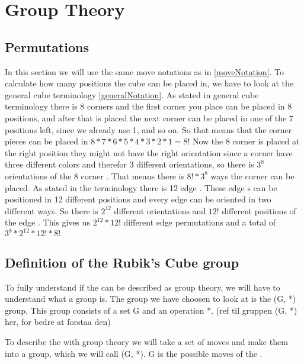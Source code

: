 \chapter{Group Theory}


\section{Permutations}
In this section we will use the same move notations as in \ref{moveNotation}.
To calculate how many positions the cube can be placed in, we have to look at the general cube terminology \ref{generalNotation}.
As stated in general cube terminology there is 8 corners \cpiece{} and the first corner you place can be placed in 8 positions, and after that is placed the next corner \cpiece{} can be placed in one of the 7 positions left, since we already use 1, and so on. So that means that the corner pieces can be placed in $8*7*6*5*4*3*2*1=8!$ Now the 8 corner \cpiece{} is placed at the right position they might not have the right orientation since a corner \cpiece{} have three different colors and therefor 3 different orientations, so there is $3^8$ orientations of the 8 corner \cpiece{}. That means there is $8!*3^8$ ways the corner \cpiece{} can be placed. As stated in the terminology there is 12 edge \cpiece{}. These edge \cpiece{}s can be positioned in 12 different positions and every edge \cpiece{} can be oriented in two different ways. So there is $2^12$ different orientations and $12!$ different positions of the edge \cpiece{}. This gives us $2^{12}*12!$ different edge permutations and a total of $3^8*2^{12}*12!*8!$

\section{Definition of the Rubik's Cube group}
To fully understand if the \rubik{} can be described as group theory, we will have to understand what a group is.
The group we have choosen to look at is the (G, *) group. This group consists of a set G and an operation *. (ref til gruppen (G, *) her, for bedre at forstaa den)

To describe the \rubik{} with group theory we will take a set of moves and make them into a group, which we will call (G, *). G is the possible moves of the \rubik{}.

